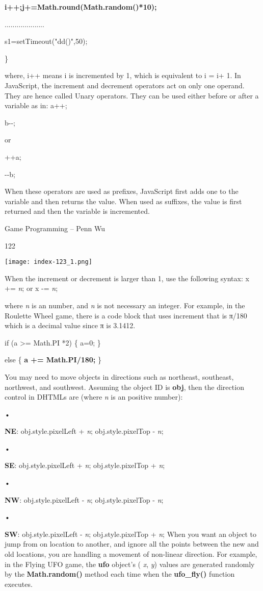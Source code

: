 \documentclass[
]{article}
\begin{document}
\textbf{i++;j+=Math.round(Math.random()*10);}

....................

s1=setTimeout("dd()",50);

\}

where, i++ means i is incremented by 1, which is equivalent to i = i+ 1.
In JavaScript, the increment and decrement operators act on only one
operand. They are hence called Unary operators. They can be used either
before or after a variable as in: a++;

b-\/-;

or

++a;

-\/-b;

When these operators are used as prefixes, JavaScript first adds one to
the variable and then returns the value. When used as suffixes, the
value is first returned and then the variable is incremented.

Game Programming -- Penn Wu

122

\protect\hypertarget{index_split_008.htmlux5cux23p123}{}{}\texttt{[image: index-123\_1.png]}

When the increment or decrement is larger than 1, use the following
syntax: x += \emph{n}; or x -= \emph{n};

where \emph{n} is an number, and \emph{n} is not necessary an integer.
For example, in the Roulette Wheel game, there is a code block that uses
increment that is π/180 which is a decimal value since π is 3.1412.

if (a \textgreater= Math.PI *2) \{ a=0; \}

else \{ \textbf{a += Math.PI/180;} \}

You may need to move objects in directions such as northeast, southeast,
northwest, and southwest. Assuming the object ID is \textbf{obj}, then
the direction control in DHTMLs are (where \emph{n} is an positive
number):

•

\textbf{NE}: obj.style.pixelLeft + \emph{n}; obj.style.pixelTop -
\emph{n};

•

\textbf{SE}: obj.style.pixelLeft + \emph{n}; obj.style.pixelTop +
\emph{n};

•

\textbf{NW}: obj.style.pixelLeft - \emph{n}; obj.style.pixelTop -
\emph{n};

•

\textbf{SW}: obj.style.pixelLeft - \emph{n}; obj.style.pixelTop +
\emph{n}; When you want an object to jump from on location to another,
and ignore all the points between the new and old locations, you are
handling a movement of non-linear direction. For example, in the Flying
UFO game, the \textbf{ufo} object's ( \emph{x}, \emph{y}) values are
generated randomly by the \textbf{Math.random()} method each time when
the \textbf{ufo\_fly()} function executes.
\end{document}
